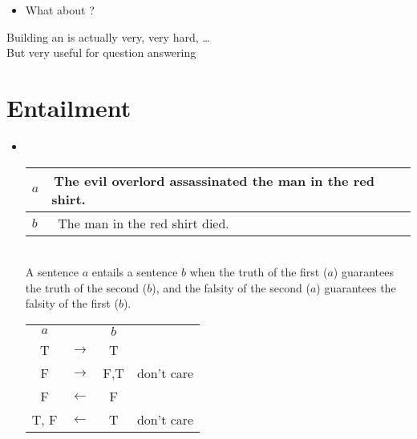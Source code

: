 \documentclass[headrule,footrule]{foils}
\begin{document}
\begin{itemize}
\item What about ?
\end{itemize}

Building an  is actually very, very hard, \ldots
\\ But very useful for question answering

\section{Entailment}

\begin{itemize}
\item {} \\[2ex]
  \begin{tabular}{ll}
    $a$ & The evil overlord  assassinated the man in the red shirt. \\ \hline
    $b$ &  The man  in the red shirt died.
  \end{tabular}
  \\[2ex]
  A sentence $a$ entails a sentence $b$ when the truth of the first ($a$)
  guarantees the truth of the second ($b$), and the falsity of the
  second ($a$) guarantees the falsity of the first ($b$).
\begin{center}
  \begin{tabular}{|c|c|c|l}
    \cline{1-3}
    $a$ &  & $b$   \\
    \cline{1-3}
    T & $\rightarrow$  & T  \\ 
    F & $\rightarrow$  & F,T & don't care\\ 
    F & $\leftarrow$  & F  \\ 
    T, F & $\leftarrow$  & T  & don't care\\ 
    \cline{1-3}
  \end{tabular}
\end{center}
\end{itemize}
\end{document}
